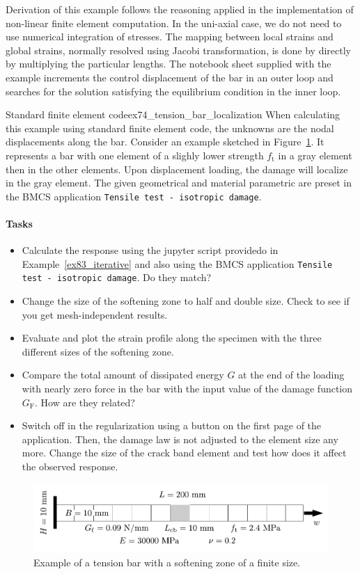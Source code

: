 \documentclass[main.tex]{subfiles}
\begin{document}
Derivation of this example follows the reasoning applied in the implementation of non-linear finite element computation. In the uni-axial case, we do not need to use numerical integration of stresses. The mapping between local strains and global strains, normally resolved using Jacobi transformation, is done by directly by multiplying the particular lengths. The notebook sheet supplied with the example increments the control displacement of the bar in an outer loop and searches for the solution satisfying the equilibrium condition in the inner loop.

\begin{bmcsex}{Standard finite element code}{ex74_tension_bar_localization}
When calculating this example using standard finite element code, the unknowns are the nodal displacements along the bar. Consider an example sketched in Figure~\ref{FIG_tension_bar}. It represents a bar with one element of a slighly lower strength $f_\mathrm{t}$ in a gray element then in the other elements. Upon displacement loading, the damage will localize in the gray element. The given geometrical and material parametric are preset in the BMCS application 
\texttt{Tensile test - isotropic damage}.

\paragraph{Tasks}
\begin{itemize}
\item Calculate the response using the jupyter script providedo in Example~\ref{ex83_iterative} and also using the BMCS application \texttt{Tensile test - isotropic damage}. Do they match?
\item Change the size of the softening zone to half and double size. Check to see if you get mesh-independent results.
\item Evaluate and plot the strain profile along the specimen with the three different sizes of the softening zone.
\item Compare the total amount of dissipated energy $G$ at the end of the loading with nearly zero force in the bar with the input value of the damage function $G_\mathrm{F}$. How are they related?
\item Switch off in the regularization using a button on the first page of the application. Then, the damage law is not adjusted to the element size any more. Change the size of the crack band element and test how does it affect the observed response.
\end{itemize}
\end{bmcsex}

\begin{figure}
\centering
\includegraphics[width=12cm]{fig/Lecture09/figure_tension}
\caption{Example of a tension bar with a softening zone of a finite size.}
\label{FIG_tension_bar}
\end{figure}
\end{document}
